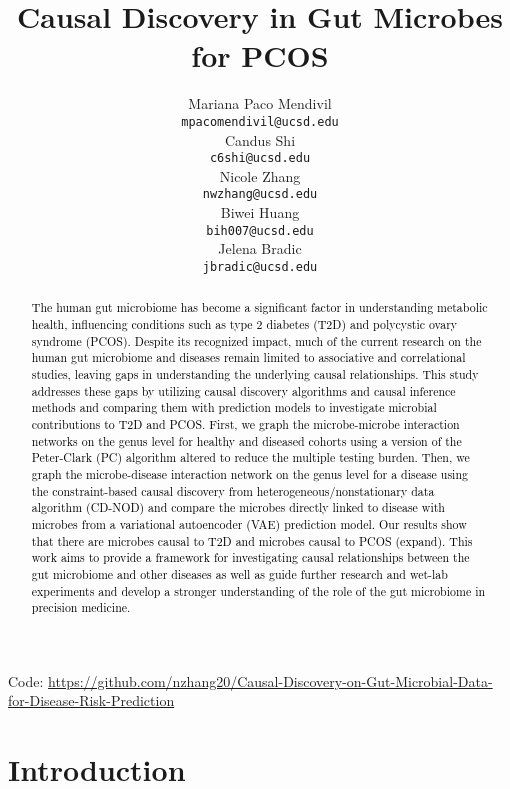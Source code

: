 \documentclass[12pt,letterpaper]{article}
\title{Causal Discovery in Gut Microbes for PCOS}
\author{Mariana Paco Mendivil \\
  {\tt mpacomendivil@ucsd.edu} \\\And
  Candus Shi \\
  {\tt c6shi@ucsd.edu} \\\And
  Nicole Zhang \\
  {\tt nwzhang@ucsd.edu} \\\And
  Biwei Huang \\
  {\tt bih007@ucsd.edu} \\\And
  Jelena Bradic \\
  {\tt jbradic@ucsd.edu}}
\begin{document}
\maketitle



\begin{abstract}
    \textcolor{black}{
    The human gut microbiome has become a significant factor in understanding metabolic health, influencing conditions such as type 2 diabetes (T2D) and polycystic ovary syndrome (PCOS). Despite its recognized impact, much of the current research on the human gut microbiome and diseases remain limited to associative and correlational studies, leaving gaps in understanding the underlying causal relationships. This study addresses these gaps by utilizing causal discovery algorithms and causal inference methods and comparing them with prediction models to investigate microbial contributions to T2D and PCOS. First, we graph the microbe-microbe interaction networks on the genus level for healthy and diseased cohorts using a version of the Peter-Clark (PC) algorithm altered to reduce the multiple testing burden. Then, we graph the microbe-disease interaction network on the genus level for a disease using the constraint-based causal discovery from heterogeneous/nonstationary data algorithm (CD-NOD) and compare the microbes directly linked to disease with microbes from a variational autoencoder (VAE) prediction model. Our results show that there are microbes causal to T2D and microbes causal to PCOS (expand). This work aims to provide a framework for investigating causal relationships between the gut microbiome and other diseases as well as guide further research and wet-lab experiments and develop a stronger understanding of the role of the gut microbiome in precision medicine.}
\end{abstract}

\begin{center}
Code: \url{https://github.com/nzhang20/Causal-Discovery-on-Gut-Microbial-Data-for-Disease-Risk-Prediction}
\end{center}

\maketoc
\clearpage


\section{Introduction}
\end{document}
